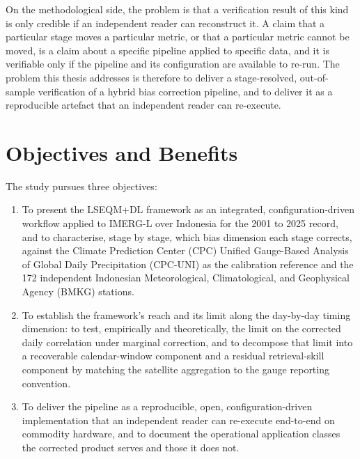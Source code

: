 On the methodological side, the problem is that a verification
result of this kind is only credible if an independent reader can
reconstruct it. A claim that a particular stage moves a
particular metric, or that a particular metric cannot be moved,
is a claim about a specific pipeline applied to specific data,
and it is verifiable only if the pipeline and its configuration
are available to re-run. The problem this thesis addresses is
therefore to deliver a stage-resolved, out-of-sample verification
of a hybrid bias correction pipeline, and to deliver it as a
reproducible artefact that an independent reader can re-execute.


\section{Objectives and Benefits}\label{sec:intro-objectives}

The study pursues three objectives:

\begin{enumerate}
    \item To present the LSEQM+DL framework as an integrated,
    configuration-driven workflow applied to IMERG-L over Indonesia
    for the 2001 to 2025 record, and to characterise, stage by
    stage, which bias dimension each stage corrects, against the
    Climate Prediction Center (CPC) Unified Gauge-Based Analysis of
    Global Daily Precipitation (CPC-UNI) as the calibration reference
    and the 172 independent Indonesian Meteorological,
    Climatological, and Geophysical Agency (BMKG) stations.
    \item To establish the framework's reach and its limit along
    the day-by-day timing dimension: to test, empirically and
    theoretically, the limit on the corrected daily correlation
    under marginal correction, and to decompose that limit into a
    recoverable calendar-window component and a residual
    retrieval-skill component by matching the satellite aggregation
    to the gauge reporting convention.
    \item To deliver the pipeline as a reproducible, open,
    configuration-driven implementation that an independent reader
    can re-execute end-to-end on commodity hardware, and to document
    the operational application classes the corrected product serves
    and those it does not.
\end{enumerate}

